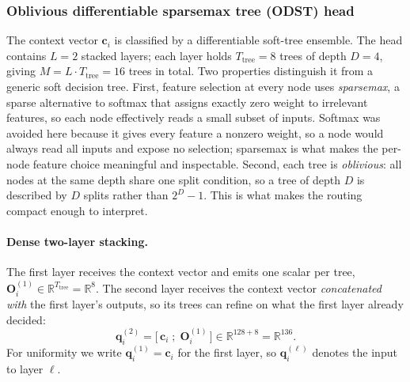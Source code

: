 \subsubsection{Oblivious differentiable sparsemax tree (ODST) head}
\label{subsubsec:odst}
The context vector \(\mathbf c_i\) is classified by a differentiable
soft-tree ensemble. The head contains \(L=2\) stacked layers; each layer
holds \(T_{\mathrm{tree}}=8\) trees of depth \(D=4\), giving
\(M=L\cdot T_{\mathrm{tree}}=16\) trees in total. Two properties distinguish
it from a generic soft decision tree. First, feature selection at every node
uses \emph{sparsemax}, a sparse alternative to softmax that assigns exactly
zero weight to irrelevant features, so each node effectively reads a small
subset of inputs. Softmax was avoided here because it gives every feature a
nonzero weight, so a node would always read all inputs and expose no
selection; sparsemax is what makes the per-node feature choice meaningful and
inspectable. Second, each tree is \emph{oblivious}: all nodes at the
same depth share one split condition, so a tree of depth \(D\) is described
by \(D\) splits rather than \(2^{D}-1\). This is what makes the routing
compact enough to interpret.
\paragraph{Dense two-layer stacking.}
The first layer receives the context vector and emits one scalar per tree,
\(\mathbf O_i^{(1)}\in\mathbb R^{T_{\mathrm{tree}}}=\mathbb R^{8}\). The
second layer receives the context vector \emph{concatenated with} the first
layer's outputs, so its trees can refine on what the first layer already
decided:
\begin{equation}
\mathbf q_i^{(2)}
=
\big[\,\mathbf c_i\;;\;\mathbf O_i^{(1)}\,\big]
\in\mathbb R^{128+8}=\mathbb R^{136}.
\label{eq:stack}
\end{equation}
For uniformity we write \(\mathbf q_i^{(1)}=\mathbf c_i\) for the first
layer, so \(\mathbf q_i^{(\ell)}\) denotes the input to layer \(\ell\).
